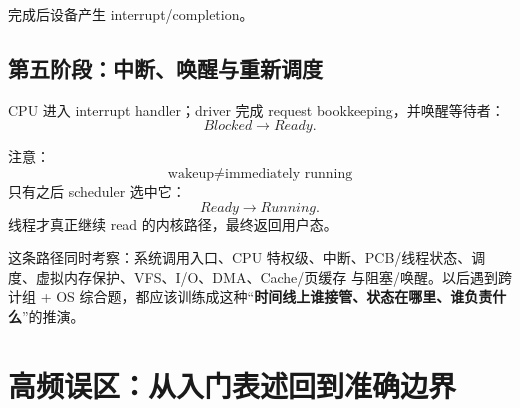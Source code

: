 \documentclass[11pt,a4paper]{ctexart}
\newcommand{\kw}[1]{\textbf{#1}}
\begin{document}
完成后设备产生 interrupt/completion。

\subsection{第五阶段：中断、唤醒与重新调度}
CPU 进入 interrupt handler；driver 完成 request bookkeeping，并唤醒等待者：
\[
Blocked\rightarrow Ready.
\]

注意：
\[
\boxed{\text{wakeup} \neq \text{immediately running}}
\]
只有之后 scheduler 选中它：
\[
Ready\rightarrow Running.
\]
线程才真正继续 read 的内核路径，最终返回用户态。

\begin{exam}
这条路径同时考察：系统调用入口、CPU 特权级、中断、PCB/线程状态、调度、虚拟内存保护、VFS、I/O、DMA、Cache/页缓存 与阻塞/唤醒。以后遇到跨计组 + OS 综合题，都应该训练成这种“\kw{时间线上谁接管、状态在哪里、谁负责什么}”的推演。
\end{exam}

\section{高频误区：从入门表述回到准确边界}
\end{document}
